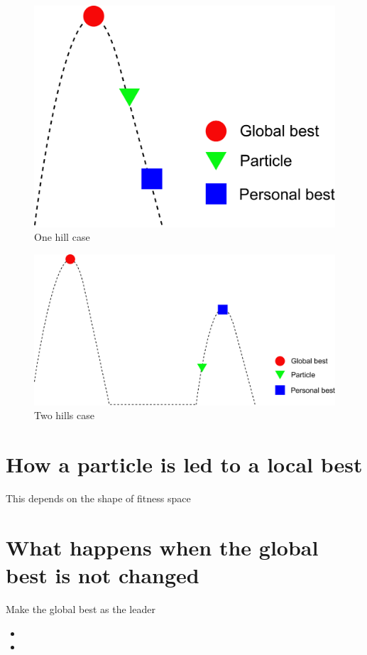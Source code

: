 \documentclass[10pt,a4paper]{article}
\begin{document}
\begin{figure}[h]
\centering
\includegraphics[width=0.5\linewidth]{./one_hill_case}
\caption{One hill case}
\label{fig:one_hill_case}
\end{figure}

\begin{figure}[h]
\centering
\includegraphics[width=0.9\linewidth]{./two_hills_case}
\caption{Two hills case}
\label{fig:two_hills_case}
\end{figure}



\section{How a particle is led to a local best}

This depends on the shape of fitness space

\section{What happens when the global best is not changed}

Make the global best as the leader

\begin{itemize}
\item
\item 
\end{itemize}
\end{document}

